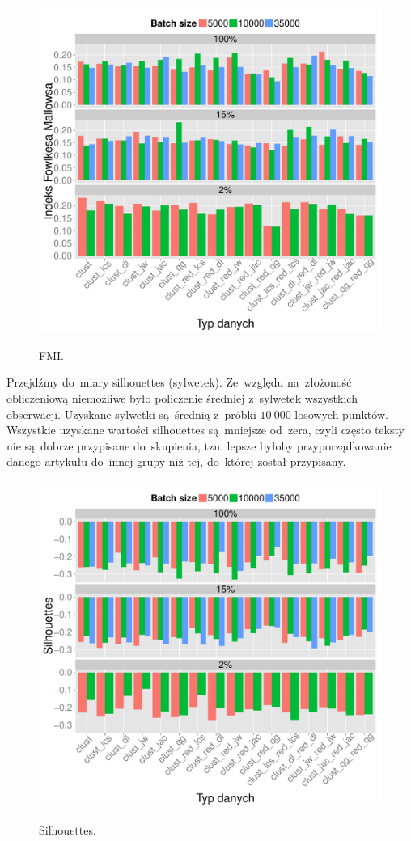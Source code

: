 \documentclass{praca1}
\begin{document}
\begin{figure}[!h]
  \centering
  \includegraphics[width=400pt]{plot15.pdf}\\
  \caption{FMI.}\label{plot:010}
\end{figure}

Przejdźmy do~miary silhouettes (sylwetek). Ze~względu na~złożoność obliczeniową niemożliwe było policzenie średniej z~sylwetek wszystkich obserwacji. Uzyskane sylwetki są~średnią z~próbki $10\ 000$ losowych punktów. Wszystkie uzyskane wartości silhouettes są~mniejsze od~zera, czyli często teksty nie są~dobrze przypisane do~skupienia, tzn. lepsze byłoby przyporządkowanie danego artykułu do~innej grupy niż tej, do~której został przypisany.

\begin{figure}[!h]
  \centering
  \includegraphics[width=400pt]{plot14.pdf}\\
  \caption{Silhouettes.}\label{plot:009}
\end{figure}
\end{document}
